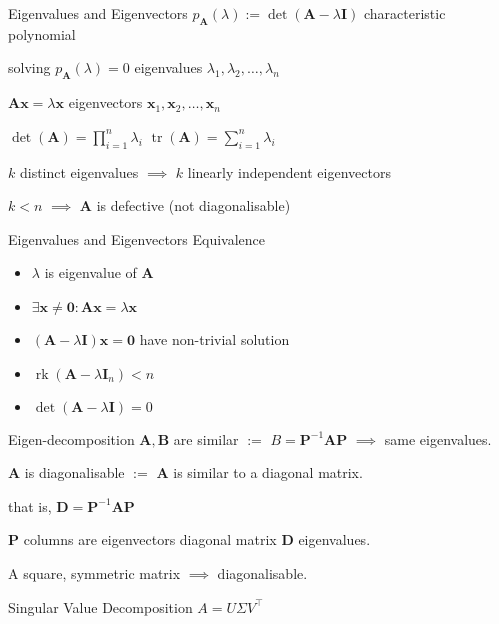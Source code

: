 \documentclass[UTF8,a4paper]{article}
\begin{document}
\begin{multicols}{3}
\begin{cheatsheetblock}{Eigenvalues and Eigenvectors}
    $p_{\bm{A}}(\lambda):=\det(\bm{A}-\lambda \bm{I})$ \hfill characteristic polynomial

    solving $p_{\bm{A}}(\lambda)=0$ \hfill eigenvalues $\lambda_1, \lambda_2, \ldots, \lambda_n$

    $\bm{A}\bm{x} = \lambda \bm{x}$ \hfill eigenvectors $\bm{x}_1, \bm{x}_2, \ldots, \bm{x}_n$

    $\det(\bm{A}) = \prod_{i=1}^n \lambda_i$ \hfill $\operatorname{tr}(\bm{A}) = \sum_{i=1}^n \lambda_i$

    $k$ distinct eigenvalues $\implies$ $k$ linearly independent eigenvectors

    $k < n$ $\implies$ $\bm{A}$ is defective (not diagonalisable)
\end{cheatsheetblock}

\begin{cheatsheetblock}{Eigenvalues and Eigenvectors Equivalence}
    \begin{itemize}
        \item $\lambda$ is eigenvalue of $\bm{A}$
        \item $\exists \bm{x} \neq \bm{0}: \bm{A} \bm{x} = \lambda \bm{x}$
        \item $(\bm{A} - \lambda \bm{I}) \bm{x} = \bm{0}$ have non-trivial solution
        \item $\operatorname{rk}(\bm{A} - \lambda \bm{I}_n) < n$
        \item $\det (\bm{A} - \lambda \bm{I}) = 0$
    \end{itemize}
\end{cheatsheetblock}

\begin{cheatsheetblock}{Eigen-decomposition}
    $\bm{A}, \bm{B}$ are similar $:=$ $B = \bm{P}^{-1} \bm{A} \bm{P}$ \hfill $\implies$ \hfill same eigenvalues.

    $\bm{A}$ is diagonalisable $:=$ $\bm{A}$ is similar to a diagonal matrix.

    \hfill that is, $\bm{D} = \bm{P}^{-1} \bm{A} \bm{P}$

    $\bm{P}$ columns are eigenvectors \hfill diagonal matrix $\bm{D}$  eigenvalues.

    A square, symmetric matrix $\implies$ diagonalisable.
\end{cheatsheetblock}

\begin{cheatsheetblock}{Singular Value Decomposition}
    $A=U \Sigma V^{\top}$


\end{cheatsheetblock}
\end{multicols}
\end{document}

